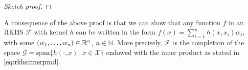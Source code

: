 \begin{proof}[Sketch proof]
%  
\end{proof}

A consequence of the above proof is that we can show that any function $f$ in an RKHS $\mathcal F$ with kernel $h$ can be written in the form $f(x) = \sum_{i=1}^n h(x, x_i)w_i$, with some $(w_1,\dots,w_n)\in\mathbb{R}^n$, $n \in \mathbb N$. 
More precisely, $\mathcal F$ is the completion of the space $\mathcal G = \text{span}\{h(\cdot,x) \, | \, x \in \mathcal X \}$ endowed with the inner product as stated in \cref{eq:rkhsinnerprod}.
